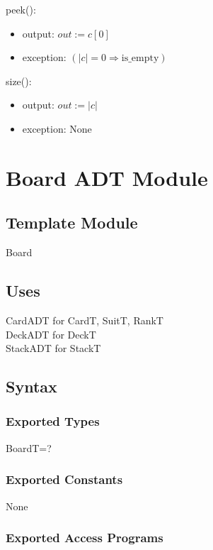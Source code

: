 \documentclass[12pt]{article}
\newcommand{\means}{\Rightarrow}
\newcommand{\m}[1]{\mbox{#1}}
\begin{document}
\noindent peek():
\begin{itemize}
    \item output: $out := c[0]$
    \item exception: $(|c|=0 \means \m{is\_empty})$
\end{itemize}

\noindent size():
\begin{itemize}
    \item output: $out := |c|$
    \item exception: None
\end{itemize}

\newpage

\section*{Board ADT Module}

\subsection*{Template Module}

Board

\subsection*{Uses}

CardADT for CardT, SuitT, RankT\\
DeckADT for DeckT\\
StackADT for StackT\\

\subsection*{Syntax}

\subsubsection*{Exported Types}

BoardT=?

\subsubsection*{Exported Constants}

None

\subsubsection*{Exported Access Programs}
\end{document}
